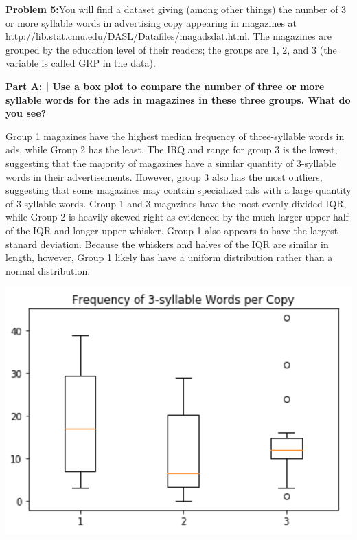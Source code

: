 \documentclass{article}
\begin{document}
 \newpage
 
 \begin{center}
      \Large\textbf{Problem 5:}You will find a dataset giving (among other things) the number of 3 or more syllable words in advertising copy appearing in magazines at http://lib.stat.cmu.edu/DASL/Datafiles/magadsdat.html. The magazines are grouped by the education level of their readers; the groups are 1, 2, and 3 (the variable is called GRP in the data).\par
 \end{center}
 
 \textbf{Part A: | Use a box plot to compare the number of three or more syllable  words for the ads in magazines in these three groups. What do you    see?}\newline\newline
 
Group 1 magazines have the highest median frequency of three-syllable words in ads, while Group 2 has the least. The IRQ and range for group 3 is the lowest, suggesting that the majority of magazines have a similar quantity of 3-syllable words in their advertisements. However, group 3 also has the most outliers, suggesting that some magazines may contain specialized ads with a large quantity of 3-syllable words. Group 1 and 3 magazines have the most evenly divided IQR, while Group 2 is heavily skewed right as evidenced by the much larger upper half of the IQR and longer upper whisker. Group 1 also appears to have the largest stanard deviation. Because the whiskers and halves of the IQR are similar in length, however, Group 1 likely has have a uniform distribution rather than a normal distribution. \newline
 
 \includegraphics{HW1_5.PNG}
 
\end{document}

